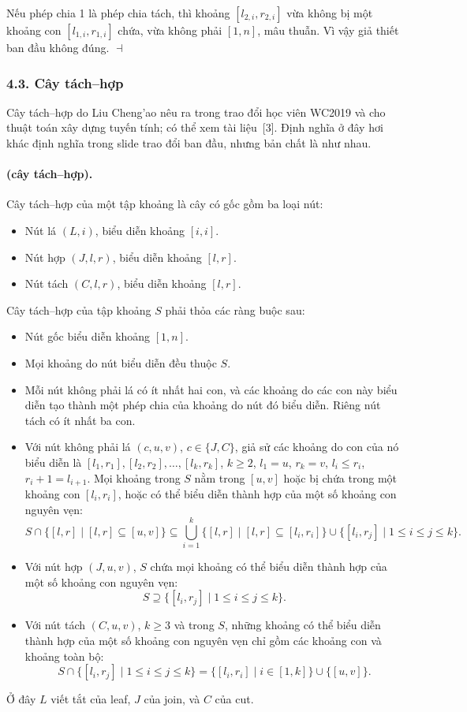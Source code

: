 \documentclass[11pt]{article}
\providecommand{\square}{\dashv}
\begin{document}
Nếu phép chia 1 là phép chia tách, thì khoảng $[l_{2,i},r_{2,i}]$ vừa không bị
một khoảng con $[l_{1,i},r_{1,i}]$ chứa, vừa không phải $[1,n]$, mâu thuẫn.
Vì vậy giả thiết ban đầu không đúng. \hfill$\square$

\subsubsection*{4.3. Cây tách--hợp}

Cây tách--hợp do Liu Cheng'ao nêu ra trong trao đổi học viên WC2019 và cho
thuật toán xây dựng tuyến tính; có thể xem tài liệu~[3]. Định nghĩa ở đây hơi
khác định nghĩa trong slide trao đổi ban đầu, nhưng bản chất là như nhau.

\paragraph{ (cây tách--hợp).}
Cây tách--hợp của một tập khoảng là cây có gốc gồm ba loại nút:
\begin{itemize}
  \item Nút lá $(L,i)$, biểu diễn khoảng $[i,i]$.
  \item Nút hợp $(J,l,r)$, biểu diễn khoảng $[l,r]$.
  \item Nút tách $(C,l,r)$, biểu diễn khoảng $[l,r]$.
\end{itemize}

Cây tách--hợp của tập khoảng $S$ phải thỏa các ràng buộc sau:
\begin{itemize}
  \item Nút gốc biểu diễn khoảng $[1,n]$.
  \item Mọi khoảng do nút biểu diễn đều thuộc $S$.
  \item Mỗi nút không phải lá có ít nhất hai con, và các khoảng do các con này
  biểu diễn tạo thành một phép chia của khoảng do nút đó biểu diễn. Riêng nút
  tách có ít nhất ba con.
  \item Với nút không phải lá $(c,u,v)$, $c\in\{J,C\}$, giả sử các khoảng do
  con của nó biểu diễn là
  $[l_1,r_1],[l_2,r_2],\ldots,[l_k,r_k]$,
  $k\ge2$, $l_1=u$, $r_k=v$, $l_i\le r_i$, $r_i+1=l_{i+1}$. Mọi khoảng trong
  $S$ nằm trong $[u,v]$ hoặc bị chứa trong một khoảng con $[l_i,r_i]$, hoặc có
  thể biểu diễn thành hợp của một số khoảng con nguyên vẹn:
  \[
    S\cap\{[l,r]\mid [l,r]\subseteq[u,v]\}
    \subseteq
    \bigcup_{i=1}^k \{[l,r]\mid [l,r]\subseteq[l_i,r_i]\}
    \cup \{[l_i,r_j]\mid 1\le i\le j\le k\}.
  \]
  \item Với nút hợp $(J,u,v)$, $S$ chứa mọi khoảng có thể biểu diễn thành hợp
  của một số khoảng con nguyên vẹn:
  \[
    S\supseteq\{[l_i,r_j]\mid 1\le i\le j\le k\}.
  \]
  \item Với nút tách $(C,u,v)$, $k\ge3$ và trong $S$, những khoảng có thể biểu
  diễn thành hợp của một số khoảng con nguyên vẹn chỉ gồm các khoảng con và
  khoảng toàn bộ:
  \[
    S\cap\{[l_i,r_j]\mid 1\le i\le j\le k\}
    =\{[l_i,r_i]\mid i\in[1,k]\}\cup\{[u,v]\}.
  \]
\end{itemize}
Ở đây $L$ viết tắt của leaf, $J$ của join, và $C$ của cut.
\end{document}
